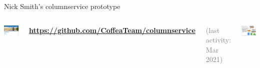 \documentclass[aspectratio=169]{beamer}
\begin{document}
\begin{frame}{Nick Smith's columnservice prototype}
\vspace{0.5 cm}

\begin{columns}
\vspace{-0.5 cm}
\includegraphics[width=\linewidth]{nsmith-1.png}

\vspace{0.5 cm}
\textcolor{blue}{\bf\url{https://github.com/CoffeaTeam/columnservice}}

\vspace{0.5 cm}
\textcolor{gray}{(last activity: Mar 2021)}

\includegraphics[width=\linewidth]{nsmith-2.png}
\end{columns}
\end{frame}
\end{document}
